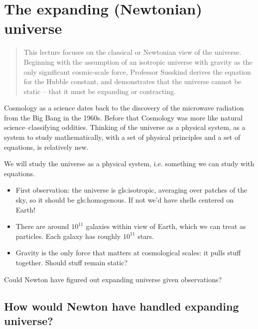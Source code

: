 \documentclass[]{article}
\begin{document}
\section{The expanding (Newtonian) universe}\label{sec:expanding:newton}

\begin{quotation}
	This lecture focuses on the classical or Newtonian view of the universe.  Beginning with the assumption of an isotropic universe with gravity as the only significant cosmic-scale force, Professor Susskind derives the equation for the Hubble constant, and demonstrates that the universe cannot be static -- that it must be expanding or contracting.
\end{quotation}

Cosmology as a science dates back to the discovery of the microwave radiation from the Big Bang in the 1960s. Before that Cosmology was more like natural science--classifying oddities. Thinking of the universe as a physical system, as a system to study mathematically, with a set of physical principles and a set of equations, is relatively new.

We will study the universe as a physical system, i.e. something we can study with equations.

\begin{itemize}
	\item First observation: the universe is \gls{gls:isotropic}, averaging over patches of the sky, so it should be \gls{gls:homogenous}. If not we'd have shells centered on Earth!

	\item There are around $10^{11}$ galaxies within view of Earth, which we can treat as particles. Each galaxy has roughly $10^{11}$ stars.
	
	\item Gravity is the only force that matters at cosmological scales: it pulls stuff together. Should stuff remain static?
\end{itemize}

Could Newton have figured out expanding universe given observations?

\subsection{How would Newton have handled expanding universe?}
\end{document}
